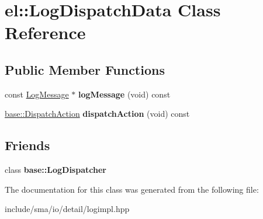 \hypertarget{classel_1_1LogDispatchData}{\section{el\-:\-:Log\-Dispatch\-Data Class Reference}
\label{classel_1_1LogDispatchData}
}
\subsection*{Public Member Functions}
\begin{DoxyCompactItemize}
\item 
\hypertarget{classel_1_1LogDispatchData_ad52d4ddc330b6260bf10e9879a653829}{const \hyperlink{classel_1_1LogMessage}{Log\-Message} $\ast$ {\bfseries log\-Message} (void) const }\label{classel_1_1LogDispatchData_ad52d4ddc330b6260bf10e9879a653829}

\item 
\hypertarget{classel_1_1LogDispatchData_aee0808c660aa39b34ee69850a2c74c09}{\hyperlink{namespaceel_1_1base_a3aa2563d38e47388ba242a1694fc2839}{base\-::\-Dispatch\-Action} {\bfseries dispatch\-Action} (void) const }\label{classel_1_1LogDispatchData_aee0808c660aa39b34ee69850a2c74c09}

\end{DoxyCompactItemize}
\subsection*{Friends}
\begin{DoxyCompactItemize}
\item 
\hypertarget{classel_1_1LogDispatchData_a84d22f9ad5b796e49ff5f15a8c32773d}{class {\bfseries base\-::\-Log\-Dispatcher}}\label{classel_1_1LogDispatchData_a84d22f9ad5b796e49ff5f15a8c32773d}

\end{DoxyCompactItemize}


The documentation for this class was generated from the following file\-:\begin{DoxyCompactItemize}
\item 
include/sma/io/detail/logimpl.\-hpp\end{DoxyCompactItemize}
